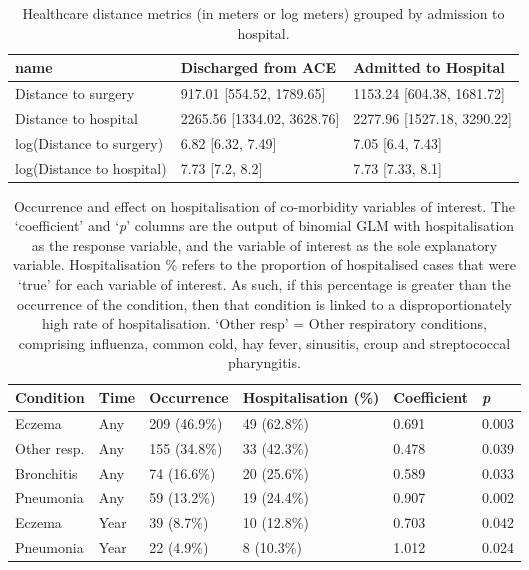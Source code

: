 \begin{table}[H]
\centering
   \caption{Healthcare distance metrics (in meters or log meters) grouped by admission to hospital.}
\begin{tabular}{lll}
  \hline
name & Discharged from ACE & Admitted to Hospital \\ 
  \hline
  Distance to surgery & 917.01 [554.52, 1789.65] & 1153.24 [604.38, 1681.72] \\ 
  Distance to hospital & 2265.56 [1334.02, 3628.76] & 2277.96 [1527.18, 3290.22] \\ 
  log(Distance to surgery) & 6.82 [6.32, 7.49] & 7.05 [6.4, 7.43] \\ 
  log(Distance to hospital) & 7.73 [7.2, 8.2] & 7.73 [7.33, 8.1] \\ 
   \hline
\end{tabular}\label{tab:additional-distance-table}
\end{table}
   
   

   \begin{table}[H]
   \caption[Occurrence and effect on hospitalisation of co-morbidity variables of interest]{Occurrence and effect on hospitalisation of co-morbidity variables of interest. The `coefficient' and `\textit{p}' columns are the output of binomial GLM with hospitalisation as the response variable, and the variable of interest as the sole explanatory variable. Hospitalisation \% refers to the proportion of hospitalised cases that were `true' for each variable of interest. As such, if this percentage is greater than the occurrence of the condition, then that condition is linked to a disproportionately high rate of hospitalisation. `Other resp' = Other respiratory conditions, comprising influenza, common cold, hay fever, sinusitis, croup and streptococcal pharyngitis.}
       \centering
       \begin{tabular}{P{2.25cm}P{1.25cm}P{2.25cm}P{2.25cm}P{1.75cm}P{1cm}}
           \toprule
           Condition & Time & Occurrence & Hospitalisation (\%) & Coefficient & \textit{p}\\
           \toprule
           Eczema & Any & 209 (46.9\%) & 49 (62.8\%) &  0.691 & 0.003\\ 
  Other resp. & Any & 155 (34.8\%) & 33 (42.3\%) & 0.478 & 0.039 \\ 
  Bronchitis & Any & 74 (16.6\%) & 20 (25.6\%) & 0.589 & 0.033 \\ 
  Pneumonia & Any & 59 (13.2\%) & 19 (24.4\%) & 0.907 & 0.002  \\ 
  Eczema & Year & 39 (8.7\%) & 10 (12.8\%) & 0.703 & 0.042 \\ 
  Pneumonia & Year & 22 (4.9\%) & 8 (10.3\%) & 1.012 & 0.024 \\ 
           	\toprule
       \end{tabular}\label{tab:additional-comorbidity-interest}
   \end{table}
   
